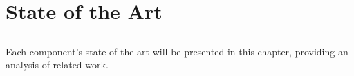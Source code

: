 \chapter{State of the Art} %
\label{cha:state_of_the_art}

\section*{} %
Each component's state of the art will be presented in this chapter, providing an analysis of related work.






